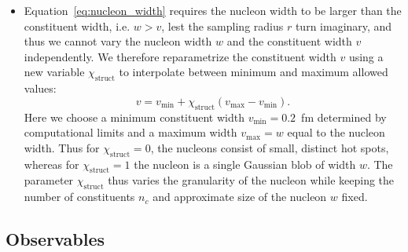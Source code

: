 \documentclass[aps,prc,reprint,amsmath,nofootinbib]{revtex4-1}
\newcommand{\X}{\chi_\mathrm{struct}}
\begin{document}
\begin{itemize}[leftmargin=1\parindent]
\item Equation~\eqref{eq:nucleon_width} requires the nucleon width to be larger than the constituent width, i.e. $w > v$, lest the sampling radius $r$ turn imaginary, and thus we cannot vary the nucleon width $w$ and the constituent width $v$ independently.
  We therefore reparametrize the constituent width $v$ using a new variable $\X$ to interpolate between minimum and maximum allowed values:
  \begin{equation}
    \label{eq:struct_param}
    v = v_\mathrm{min} + \X (v_\mathrm{max} - v_\mathrm{min}).
  \end{equation}
  Here we choose a minimum constituent width $v_\mathrm{min} = 0.2$~fm determined by computational limits and a maximum width $v_\mathrm{max} = w$ equal to the nucleon width.
  Thus for $\X=0$, the nucleons consist of small, distinct hot spots, whereas for $\X=1$ the nucleon is a single Gaussian blob of width $w$.
  The parameter $\X$ thus varies the granularity of the nucleon while keeping the number of constituents $n_c$ and approximate size of the nucleon $w$ fixed.
\end{itemize}

\subsection{Observables}
\label{sec:observables}
\end{document}
